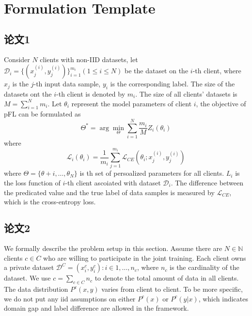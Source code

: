 \section{Formulation Template}
\subsection{论文1}
Consider $N$ clients with non-IID datasets, let $\mathcal{D}_i=\{(x_j^{(i)},y_j^{(i)})\}_{i=1}^{m_i}(1\leq i\leq N)$ be the dataset on the $i$-th client, where $x_j$ is the $j$-th input data sample, $y_i$ is the corresponding label. The size of the datasets ont the $i$-th client is denoted by $m_i$. The size of all clients' datasets is $M=\sum_{i=1}^N m_i$. Let $\theta_i$ represent the model parameters of client $i$, the objective of pFL can be formulated as
\begin{equation*}
    \Theta^{*}=\arg\operatorname*{\min}_{\Theta}\sum_{i=1}^{N}\frac{m_{i}}{M}Z_{i}(\theta_{i})
\end{equation*}
where
\begin{equation*}
    \mathcal{L}_i(\theta_i)=\frac1{m_i}\sum_{j=1}^{m_i}\mathcal{L}_{CE}(\theta_i;x_j^{(i)},y_j^{(i)})
\end{equation*}
where $\Theta=\{\theta+i,\ldots,\theta_N\}$ is th set of persoalized parameters for all clients. $L_i$ is the loss function of $i$-th client ascoiated with dataset $\mathcal{D}_i$. The difference between the predicated value and the true label of data samples is measured by $\mathcal{L}_{CE}$, which is the cross-entropy loss.

\subsection{论文2}
We formally describe the problem setup in this section. Assume there are $N\in\mathbb{N}$ clients $c\in C$ who are willing to participate in the joint training. Each client owns a private dataset $\mathcal{D}^C = {(x_i^c, y_i^c) : i\in{1,\ldots,n_c}}$, where $n_c$ is the cardinality of the dataset. We use $c=\sum_{c\in C}n_c$ to denote the total amount of data in all clients. The data distribution $P^c(x, y)$ varies from client to client. To be more specific, we do not put any \acs{iid} assumptions on either $P^c(x)$ or $P^c(y|x)$, which indicates domain gap and label difference are allowed in the framework.

